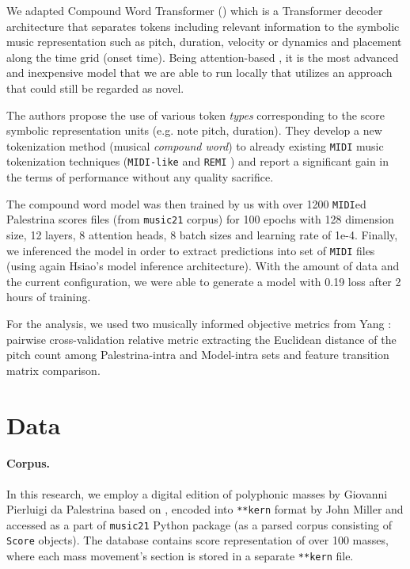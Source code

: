 \documentclass{article}
\begin{document}
\begin{multicols}{2}
        We adapted Compound Word Transformer (\cite{hsiao_compound_2021}) which is a Transformer decoder architecture that separates tokens including relevant information to the symbolic music representation such as pitch, duration, velocity or dynamics and placement along the time grid (onset time). Being attention-based \cite{vaswani_attention_2023}, it is the most advanced and inexpensive model that we are able to run locally that utilizes an approach that could still be regarded as novel.
    
        The authors propose the use of various token \emph{types} corresponding to the score symbolic representation units (e.g. note pitch, duration). They develop a new tokenization method (musical \emph{compound word}) to already existing \texttt{MIDI} music tokenization techniques (\texttt{MIDI-like} \cite{MidiLike} and \texttt{REMI} \cite{remi}) and report a significant gain in the terms of performance without any quality sacrifice. 
        
        The compound word model was then trained by us with over 1200 \texttt{MIDI}ed Palestrina scores files (from \texttt{music21} corpus) for 100 epochs with 128 dimension size, 12 layers, 8 attention heads, 8 batch sizes and learning rate of 1e-4. Finally, we inferenced the model in order to extract predictions into set of \texttt{MIDI} files (using again Hsiao's model inference architecture). With the amount of data and the current configuration, we were able to generate a model with 0.19 loss after 2 hours of training.

        For the analysis, we used two musically informed objective metrics from Yang \cite{yang_evaluation_2020}: pairwise cross-validation relative metric extracting the Euclidean distance of the pitch count among Palestrina-intra and Model-intra sets and feature transition matrix comparison.
        
    \section{Data}
        
        \paragraph{Corpus.}
        In this research, we employ a digital edition of polyphonic masses by Giovanni Pierluigi da Palestrina based on \cite{palestrina1961opere}, encoded into \texttt{**kern} format by John Miller and accessed as a part of \texttt{music21} Python package (as a parsed corpus consisting of \texttt{Score} objects). The database contains score representation of over 100 masses, where each mass movement's section is stored in a separate \texttt{**kern} file.
        

\end{multicols}
\end{document}
